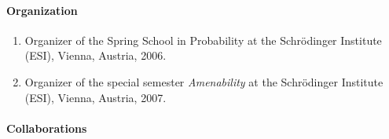 \paragraph{Organization}


\begin{enumerate}
\item  Organizer of the Spring School in Probability at the Schr\"{o}dinger
Institute (ESI), Vienna, Austria, 2006.

\item  Organizer of the special semester \textit{Amenability} at the
Schr\"{o}dinger Institute (ESI), Vienna, Austria, 2007.

\end{enumerate}

\paragraph{Collaborations}

